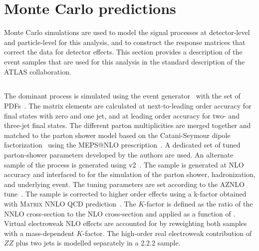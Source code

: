 \section{Monte Carlo predictions}
\label{sec:montecarlopred}
Monte Carlo simulations are used to model the signal processes at detector-level and particle-level for this analysis, and to construct the response matrices that correct the data for detector effects. This section provides a description of the event samples that are used for this analysis in the standard description of the ATLAS collaboration.  %

\subsection{\qqFourL}
The dominant \qqFourL process is simulated using the  event generator~\cite{Bothmann:2019yzt} with the \nnpdfnnlo{} set of PDFs~\cite{Ball:2014uwa}. The matrix elements are calculated at next-to-leading order accuracy for final states with zero and one jet, and at leading order accuracy for two- and three-jet final states. The different parton multiplicities are merged together and matched to the \SHERPA parton shower model based on the Catani-Seymour dipole factorization~\cite{Gleisberg:2008fv,Schumann:2007mg} using the MEPS@NLO prescription~\cite{Hoeche:2011fd,Hoeche:2012yf,Catani:2001cc,Hoeche:2009r}. A dedicated set of tuned parton-shower parameters developed by the \SHERPA authors are used. 
An alternate sample of the \qqFourL process is generated using  \POWHEGBOX v2~\cite{Alioli:2010xd,Melia:2011tj,Nason:2013ydw}. The sample is generated at NLO accuracy and interfaced to  for the simulation of the parton shower, hadronization, and underlying event. The tuning parameters are set according to the AZNLO tune~\cite{STDM-2012-23}. The sample is corrected to higher order effects using a k-factor obtained with \textsc{Matrix} NNLO QCD prediction~\cite{Cascioli:2014yka,Grazzini:2015hta,Grazzini:2017mhc,Kallweit:2018nyv}. The $K$-factor is defined as the ratio of the NNLO cross-section to the NLO cross-section and applied as a function of \mFourL{}. 
Virtual electroweak NLO effects are accounted for by reweighting both samples with a mass-dependent $K$-factor. The high-order real electroweak contribution of $ZZ$ plus two jets is modelled separately in a \SHERPA{} {2.2.2} sample. 

